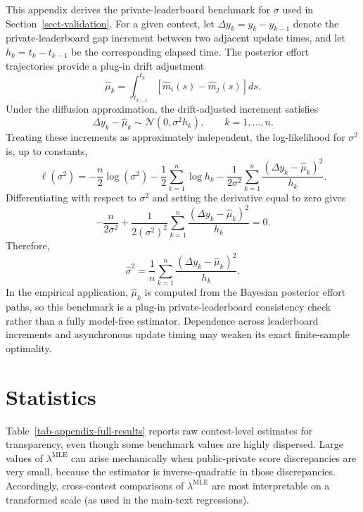 \documentclass[mnsc]{informs3}
\begin{document}
\begin{APPENDICES}
This appendix derives the private-leaderboard benchmark for $\sigma$ used in Section~\ref{sect-validation}.
For a given contest, let $\Delta y_k=y_k-y_{k-1}$ denote the private-leaderboard gap increment between two adjacent update times, and let $h_k=t_k-t_{k-1}$ be the corresponding elapsed time.
The posterior effort trajectories provide a plug-in drift adjustment
\[
\hat\mu_k=\int_{t_{k-1}}^{t_k}\left[\hat m_i(s)-\hat m_j(s)\right]ds.
\]
Under the diffusion approximation, the drift-adjusted increment satisfies
\[
\Delta y_k-\hat\mu_k\sim\mathcal N(0,\sigma^2 h_k),
\qquad k=1,\ldots,n.
\]
Treating these increments as approximately independent, the log-likelihood for $\sigma^2$ is, up to constants,
\[
\ell(\sigma^2)
=
-\frac{n}{2}\log(\sigma^2)
-\frac{1}{2}\sum_{k=1}^n\log h_k
-\frac{1}{2\sigma^2}\sum_{k=1}^n
\frac{(\Delta y_k-\hat\mu_k)^2}{h_k}.
\]
Differentiating with respect to $\sigma^2$ and setting the derivative equal to zero gives
\[
-\frac{n}{2\sigma^2}
+
\frac{1}{2(\sigma^2)^2}
\sum_{k=1}^n
\frac{(\Delta y_k-\hat\mu_k)^2}{h_k}
=0.
\]
Therefore,
\begin{equation}\label{normal-mle-sigma}
\hat{\sigma}^2
=
\frac{1}{n}\sum_{k=1}^n
\frac{(\Delta y_k-\hat\mu_k)^2}{h_k}.
\end{equation}
In the empirical application, $\hat\mu_k$ is computed from the Bayesian posterior effort paths, so this benchmark is a plug-in private-leaderboard consistency check rather than a fully model-free estimator.
Dependence across leaderboard increments and asynchronous update timing may weaken its exact finite-sample optimality.








\section{Statistics}\label{appendix-statistics}

Table~\ref{tab-appendix-full-results} reports raw contest-level estimates for transparency, even though some benchmark values are highly dispersed.
Large values of $\lambda^{\text{MLE}}$ can arise mechanically when public-private score discrepancies are very small, because the estimator is inverse-quadratic in those discrepancies.
Accordingly, cross-contest comparisons of $\lambda^{\text{MLE}}$ are most interpretable on a transformed scale (as used in the main-text regressions).


\end{APPENDICES}
\end{document}
